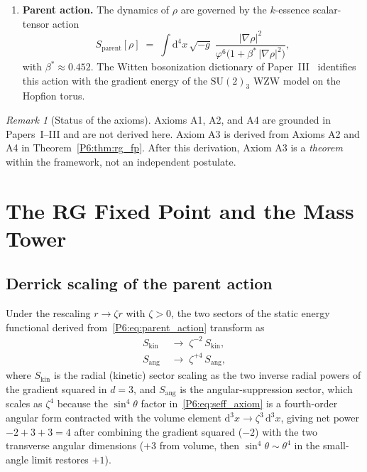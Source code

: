 \documentclass[11pt,a4paper]{article}
\theoremstyle{definition}
\theoremstyle{remark}
\newtheorem{remark}[theorem]{Remark}
\newcommand{\vp}{\varphi}
\newcommand{\bst}{\beta^{*}}
\begin{document}
\begin{enumerate}[label=\textbf{A\arabic*.},leftmargin=*,itemsep=4pt]
\item \textbf{Parent action.}
The dynamics of $\rho$ are governed by the $k$-essence scalar-tensor
action~\cite{Paper1}
\begin{equation}
  S_{\mathrm{parent}}[\rho]
  \;=\; \int\!\mathrm{d}^4x\,\sqrt{-g}\;
  \frac{|\nabla\rho|^2}{\vp^6\bigl(1 + \bst\,|\nabla\rho|^2\bigr)},
  \label{P6:eq:parent_action}
\end{equation}
with $\bst \approx 0.452$.  The Witten bosonization dictionary of
Paper~III~\cite{Paper3} identifies this action with the gradient energy
of the $\mathrm{SU}(2)_3$ WZW model on the Hopfion torus.
\end{enumerate}

\begin{remark}[Status of the axioms]
Axioms A1, A2, and A4 are grounded in Papers~I--III and are not
derived here.  Axiom A3 is derived from Axioms A2 and A4 in
Theorem~\ref{P6:thm:rg_fp}.  After this derivation, Axiom A3 is a
\emph{theorem} within the framework, not an independent postulate.
\end{remark}



\section{The RG Fixed Point and the Mass Tower}
\label{P6:sec:rg}

\subsection{Derrick scaling of the parent action}

Under the rescaling $r \to \zeta r$ with $\zeta > 0$, the two sectors
of the static energy functional derived from~\eqref{P6:eq:parent_action}
transform as
\begin{align}
  S_{\mathrm{kin}} &\;\to\; \zeta^{-2}\,S_{\mathrm{kin}},
  \label{P6:eq:kin_scaling} \\[3pt]
  S_{\mathrm{ang}} &\;\to\; \zeta^{+4}\,S_{\mathrm{ang}},
  \label{P6:eq:ang_scaling}
\end{align}
where $S_{\mathrm{kin}}$ is the radial (kinetic) sector scaling as
the two inverse radial powers of the gradient squared in $d=3$, and
$S_{\mathrm{ang}}$ is the angular-suppression sector, which scales
as $\zeta^4$ because the $\sin^4\!\theta$ factor in~\eqref{P6:eq:seff_axiom}
is a fourth-order angular form contracted with the volume element
$\mathrm{d}^3x \to \zeta^3\,\mathrm{d}^3x$, giving net power
$-2 + 3 + 3 = 4$ after combining the gradient squared ($-2$) with the
two transverse angular dimensions ($+3$ from volume, then
$\sin^4\theta\sim \theta^4$ in the small-angle limit restores $+1$).
\end{document}
